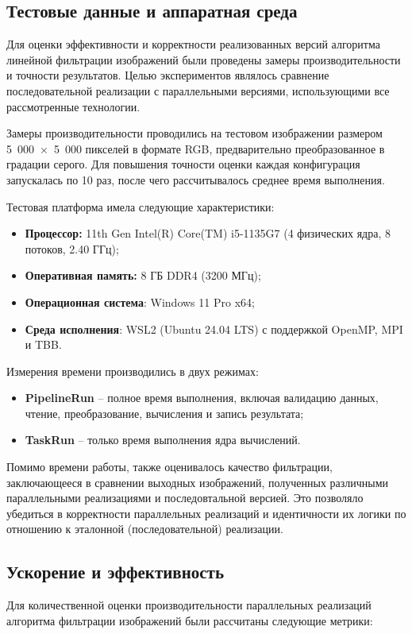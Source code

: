 \documentclass[14pt, a4paper]{extarticle}
\begin{document}
\subsection{Тестовые данные и аппаратная среда}
Для оценки эффективности и корректности реализованных версий алгоритма линейной фильтрации изображений были проведены замеры производительности и точности результатов. Целью экспериментов являлось сравнение последовательной реализации с параллельными версиями, использующими все рассмотренные технологии.

Замеры производительности проводились на тестовом изображении размером 5~000~×~5~000 пикселей в формате RGB, предварительно преобразованное в градации серого. Для повышения точности оценки каждая конфигурация запускалась по 10 раз, после чего рассчитывалось среднее время выполнения.

Тестовая платформа имела следующие характеристики:
\begin{itemize}
  \item \textbf{Процессор:} 11th Gen Intel(R) Core(TM) i5-1135G7 (4 физических ядра, 8 потоков, 2.40 ГГц);
  \item \textbf{Оперативная память:} 8 ГБ DDR4 (3200 МГц);
  \item \textbf{Операционная система}: Windows 11 Pro x64;
  \item \textbf{Среда исполнения}: WSL2 (Ubuntu 24.04 LTS) с поддержкой OpenMP, MPI и TBB.
\end{itemize}

Измерения времени производились в двух режимах:
\begin{itemize}
  \item \textbf{PipelineRun} – полное время выполнения, включая валидацию данных, чтение, преобразование, вычисления и запись результата;
  \item \textbf{TaskRun} – только время выполнения ядра вычислений.
\end{itemize}

Помимо времени работы, также оценивалось качество фильтрации, заключающееся в сравнении выходных изображений, полученных различными параллельными реализациями и последовтальной версией. Это позволяло убедиться в корректности параллельных реализаций и идентичности их логики по  отношению к эталонной (последовательной) реализации.

\subsection{Ускорение и эффективность}
Для количественной оценки производительности параллельных реализаций алгоритма фильтрации изображений были рассчитаны следующие метрики:
\end{document}
